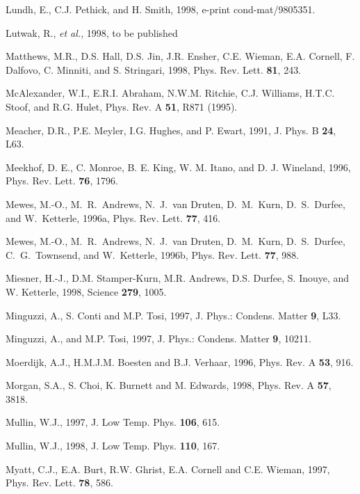 \begin{references}
     Lundh, E., C.J. Pethick, and H. Smith, 1998, 
e-print cond-mat/9805351. 

     Lutwak, R., {\it et al.}, 1998, to be published

 Matthews, M.R., D.S. Hall, D.S. Jin, J.R. Ensher,
C.E. Wieman, E.A. Cornell, F. Dalfovo, C. Minniti, and S. Stringari, 1998,
Phys. Rev. Lett. {\bf 81}, 243.  

 McAlexander, W.I., E.R.I. Abraham, N.W.M. Ritchie,
C.J. Williams, H.T.C. Stoof, and R.G. Hulet, Phys. Rev. A {\bf 51}, 
R871 (1995).

  Meacher, D.R., P.E. Meyler, I.G. Hughes, and P.
Ewart, 1991, J. Phys. B {\bf 24}, L63.

  Meekhof, D. E., C. Monroe, B. E. King, W. M. Itano,
and D. J. Wineland, 1996, Phys. Rev. Lett. {\bf 76}, 1796.

   Mewes, M.-O., M.\ R.\ Andrews, N.\ J.\ van Druten,
D.\ M.\ Kurn, D.\ S.\ Durfee, and W.\ Ketterle, 1996a, Phys. Rev. Lett.
{\bf 77}, 416.

   Mewes, M.-O., M.\ R.\ Andrews, N.\ J.\ van Druten,
D.\ M.\ Kurn, D.\ S.\ Durfee, C.\ G.\ Townsend, and W.\ Ketterle, 1996b,
Phys. Rev. Lett. {\bf 77}, 988.

  Miesner, H.-J., D.M. Stamper-Kurn, M.R. Andrews, 
D.S. Durfee, S. Inouye, and W. Ketterle, 1998, Science {\bf 279}, 1005.

 Minguzzi, A., S. Conti and M.P. Tosi, 1997, J.
Phys.: Condens. Matter {\bf 9}, L33.

 Minguzzi, A., and M.P. Tosi, 1997, J. Phys.:
Condens. Matter {\bf 9}, 10211. 

 Moerdijk, A.J., H.M.J.M. Boesten and B.J. Verhaar,
1996, Phys. Rev. A {\bf 53}, 916.

  Morgan, S.A., S. Choi, K. Burnett and M. Edwards, 1998,
Phys. Rev. A {\bf 57}, 3818. 

   Mullin, W.J., 1997, J. Low Temp. Phys. {\bf 106},
615.

   Mullin, W.J., 1998, J. Low Temp. Phys. {\bf 110},
167.

    Myatt, C.J., E.A. Burt, R.W. Ghrist, E.A. Cornell
and C.E. Wieman, 1997, Phys. Rev. Lett. {\bf 78}, 586.


\end{references}
